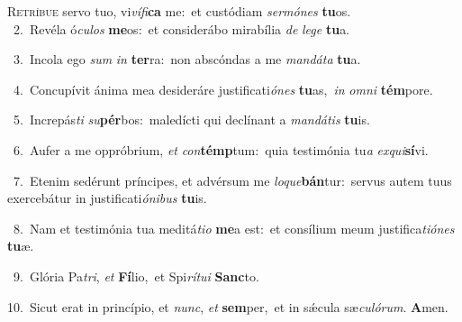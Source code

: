 \lettrine{\initial\textcolor{\initialcolor}{R}}{etríbue} servo tuo, vi\-\textit{ví}\-\textit{fi}\textbf{ca} me:~\star et custódiam \textit{ser}\-\textit{mó}\textit{nes} \textbf{tu}\-os.\\
{\numbfont\textcolor{\numbcolor}{~2.}}~Revéla ó\-\textit{cu}\-\textit{los} \textbf{me}\-os:~\star et considerábo mirabília \textit{de} \textit{le}\-\textit{ge} \textbf{tu}\-a.\par
{\numbfont\textcolor{\numbcolor}{~3.}}~Incola ego \textit{sum} \textit{in} \textbf{ter}\-ra:~\star non abscóndas a me \textit{man}\-\textit{dá}\textit{ta} \textbf{tu}\-a.\par
{\numbfont\textcolor{\numbcolor}{~4.}}~Concupívit ánima mea desideráre justificati\-\textit{ó}\-\textit{nes} \textbf{tu}\-as,~\star \textit{in} \textit{om}\-\textit{ni} \textbf{tém}\-pore.\par
{\numbfont\textcolor{\numbcolor}{~5.}}~Increpás\textit{ti} \textit{su}\-\textbf{pér}bos:~\star maledícti qui declínant a \textit{man}\-\textit{dá}\textit{tis} \textbf{tu}\-is.\par
{\numbfont\textcolor{\numbcolor}{~6.}}~Aufer a me oppróbrium, \textit{et} \textit{con}\-\textbf{témp}tum:~\star quia testimónia tu\textit{a} \textit{ex}\-\textit{qui}\textbf{sí}vi.\par
{\numbfont\textcolor{\numbcolor}{~7.}}~Etenim sedérunt príncipes, et advérsum me \textit{lo}\-\textit{que}\textbf{bán}tur:~\star servus autem tuus exercebátur in justificati\-\textit{ó}\-\textit{ni}\textit{bus} \textbf{tu}\-is.\par
{\numbfont\textcolor{\numbcolor}{~8.}}~Nam et testimónia tua meditá\-\textit{ti}\-\textit{o} \textbf{me}\-a est:~\star et consílium meum justifica\-\textit{ti}\-\textit{ó}\textit{nes} \textbf{tu}\-æ.\par
{\numbfont\textcolor{\numbcolor}{~9.}}~Glória Pa\-\textit{tri}\-, \textit{et} \textbf{Fí}\-lio,~\star et Spi\-\textit{rí}\-\textit{tu}\textit{i} \textbf{Sanc}\-to.\par
{\numbfont\textcolor{\numbcolor}{10.}}~Sicut erat in princípio, et \textit{nunc}\-, \textit{et} \textbf{sem}\-per,~\star et in sǽcula sæ\-\textit{cu}\-\textit{ló}\textit{rum}. \textbf{A}\-men.\par
